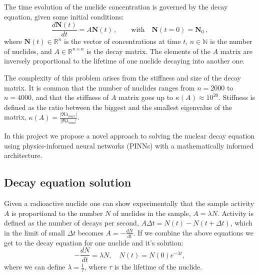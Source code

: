 \documentclass[10pt]{article}
\begin{document}
The time evolution of the nuclide concentration is governed by the decay equation, given some initial conditions:
\begin{equation}\label{eq:decay_eq}
        \frac{d\mathbf{N}(t)}{dt} = A \mathbf{N}(t) \,,\qquad \text{with} \quad \mathbf{N}(t=0) = \mathbf{N}_0 \,,
\end{equation}
where $\mathbf{N}(t) \in \mathbb{R}^n$ is the vector of concentrations at time $t$, $n \in \mathbb{N}$ is the number of nuclides, and $A \in \mathbb{R}^{n \times n}$ is the decay matrix. The elements of the $A$ matrix are inversely proportional to the lifetime of one nuclide decaying into another one.

The complexity of this problem arises from the stiffness and size of the decay matrix. It is common that the number of nuclides ranges from $n = 2000$ to $n = 4000$, and that the stiffness of $A$ matrix goes up to $\kappa(A) \approx 10^{20}$. Stiffness is defined as the ratio between the biggest and the smallest eigenvalue of the matrix, $\kappa(A) = \frac{|\Re\lambda_{max}|}{|\Re\lambda_{min}|}$.

In this project we propose a novel approach to solving the nuclear decay equation using physics-informed neural networks (PINNs) with a mathematically informed architecture.

\subsection{Decay equation solution}
Given a radioactive nuclide one can show experimentally that the sample activity $A$ is proportional to the number $N$ of nuclides in the sample, $A = \lambda N$. Activity is defined as the number of decays per second, $A\Delta t = N(t) - N(t+\Delta t)$, which in the limit of small $\Delta t$ becomes $A = - \frac{dN}{dt}$. If we combine the above equations we get to the decay equation for one nuclide and it's solution:
\begin{equation*}
-\frac{dN}{dt} = \lambda N, \quad N(t) = N(0)e^{-\lambda t},
\end{equation*}
where we can define $\lambda = \frac{1}{\tau}$, where $\tau$ is the lifetime of the nuclide.
\end{document}
